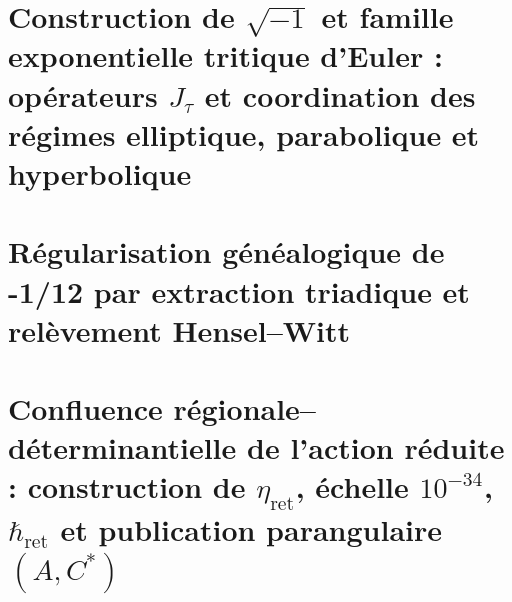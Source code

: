 \chapter{Construction de \texorpdfstring{\(\sqrt{-1}\)}{√(−1)} et famille exponentielle tritique d'Euler : opérateurs \texorpdfstring{\(J_\tau\)}{J_τ} et coordination des régimes elliptique, parabolique et hyperbolique}
\label{chap:sucesor-102-12}



\chapter{Régularisation généalogique de -1/12 par extraction triadique et relèvement Hensel–Witt}
\label{chap:sucesor-102-13}


\chapter{Confluence régionale–déterminantielle de l'action réduite : construction de \texorpdfstring{\(\eta_{\mathrm{ret}}\)}{η_ret}, échelle \texorpdfstring{\(10^{-34}\)}{10⁻³⁴}, \texorpdfstring{\(\hbar_{\mathrm{ret}}\)}{ℏ_ret} et publication parangulaire \texorpdfstring{\((A,C^*)\)}{(A,C*)}}
\label{chap:sucesor-102-14}























